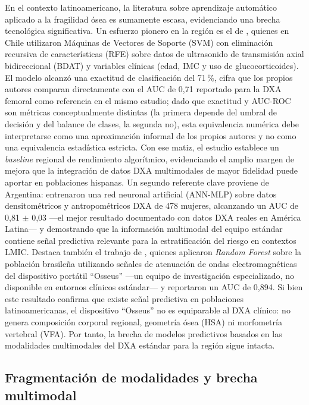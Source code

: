 \documentclass[../tesis.tex]{subfiles}
\begin{document}
En el contexto latinoamericano, la literatura sobre aprendizaje automático aplicado a la fragilidad ósea es sumamente escasa, evidenciando una brecha tecnológica significativa.
Un esfuerzo pionero en la región es el de \textcite{Miranda2021}, quienes en Chile utilizaron Máquinas de Vectores de Soporte (SVM) con eliminación recursiva de características (RFE) sobre datos de ultrasonido de transmisión axial bidireccional (BDAT) y variables clínicas (edad, IMC y uso de glucocorticoides).
El modelo alcanzó una exactitud de clasificación del 71\,\%, cifra que los propios autores comparan directamente con el AUC de 0{,}71 reportado para la DXA femoral como referencia en el mismo estudio; dado que exactitud y AUC-ROC son métricas conceptualmente distintas (la primera depende del umbral de decisión y del balance de clases, la segunda no), esta equivalencia numérica debe interpretarse como una aproximación informal de los propios autores y no como una equivalencia estadística estricta.
Con ese matiz, el estudio establece un \textit{baseline} regional de rendimiento algorítmico, evidenciando el amplio margen de mejora que la integración de datos DXA multimodales de mayor fidelidad puede aportar en poblaciones hispanas.
Un segundo referente clave proviene de Argentina: \textcite{Vega2024} entrenaron una red neuronal artificial (ANN-MLP) sobre datos densitométricos y antropométricos DXA de 478 mujeres, alcanzando un AUC de 0{,}81 $\pm$ 0{,}03 ---el mejor resultado documentado con datos DXA reales en América Latina--- y demostrando que la información multimodal del equipo estándar contiene señal predictiva relevante para la estratificación del riesgo en contextos LMIC.
Destaca también el trabajo de \textcite{Albuquerque2023}, quienes aplicaron \textit{Random Forest} sobre la población brasileña utilizando señales de atenuación de ondas electromagnéticas del dispositivo portátil ``Osseus'' ---un equipo de investigación especializado, no disponible en entornos clínicos estándar--- y reportaron un AUC de 0{,}894. Si bien este resultado confirma que existe señal predictiva en poblaciones latinoamericanas, el dispositivo ``Osseus'' no es equiparable al DXA clínico: no genera composición corporal regional, geometría ósea (HSA) ni morfometría vertebral (VFA). Por tanto, la brecha de modelos predictivos basados en las modalidades multimodales del DXA estándar para la región sigue intacta.

\subsection{Fragmentación de modalidades y brecha multimodal}
\end{document}
